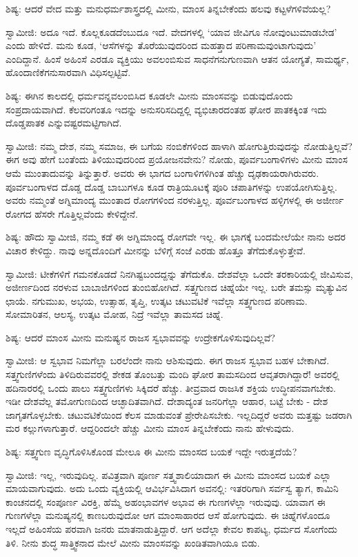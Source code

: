 ಶಿಷ್ಯ: ಆದರೆ ವೇದ ಮತ್ತು ಮನುಧರ್ಮಶಾಸ್ತ್ರದಲ್ಲಿ ಮೀನು, ಮಾಂಸ ತಿನ್ನಬೇಕೆಂದು ಹಲವು ಕಟ್ಟಳೆಗಳಿವೆಯಲ್ಲ?

ಸ್ವಾಮೀಜಿ: ಅದೂ ಇದೆ. ಕೊಲ್ಲಕೂಡದೆಂಬುದೂ ಇದೆ. ವೇದಗಳಲ್ಲಿ ‘ಯಾವ ಜೀವಿಗೂ ನೋವುಂಟುಮಾಡಬೇಡ’ ಎಂದು ಹೇಳಿದೆ. ಮನು ಕೂಡ, ‘ಆಸೆಗಳನ್ನು ತೊರೆಯುವುದರಿಂದ ಮಹತ್ತಾದ ಪರಿಣಾಮವುಂಟಾಗುವುದು’ ಎಂದಿದ್ದಾನೆ. ಹಿಂಸೆ ಅಹಿಂಸೆ ಎರಡೂ ವ್ಯಕ್ತಿಯು ಅವಲಂಬಿಸುವ ಸಾಧನೆಗನುಗುಣವಾಗಿ ಆತನ ಯೋಗ್ಯತೆ, ಸಾಮರ್ಥ್ಯ, ಹೊಂದಾಣಿಕೆಗನುಸಾರವಾಗಿ ವಿಧಿಸಲ್ಪಟ್ಟಿವೆ.

ಶಿಷ್ಯ: ಈಗಿನ ಕಾಲದಲ್ಲಿ ಧರ್ಮವನ್ನವಲಂಬಿಸಿದ ಕೂಡಲೇ ಮೀನು ಮಾಂಸವನ್ನು ಬಿಡುವುದೊಂದು ಸಂಪ್ರದಾಯವಾಗಿದೆ. ಕೆಲವರಿಗಂತೂ ಇದನ್ನು ಅನುಸರಿಸದಿದ್ದಲ್ಲಿ ವ್ಯಭಿಚಾರದಂತಹ ಘೋರ ಪಾತಕಕ್ಕಿಂತ ಇದು ದೊಡ್ಡಪಾತಕ ಎನ್ನುವಷ್ಟರಮಟ್ಟಿಗಾಗಿದೆ.

ಸ್ವಾಮೀಜಿ: ನಮ್ಮ ದೇಶ, ನಮ್ಮ ಸಮಾಜ, ಈ ಬಗೆಯ ನಂಬಿಕೆಗಳಿಂದ ಹಾಳಾಗಿ ಹೋಗುತ್ತಿರುವುದನ್ನು ನೋಡುತ್ತಿಲ್ಲವೆ? ಈಗ ಅವು ಹೇಗೆ ಬಂತೆಂದು ತಿಳಿಯುವುದರಿಂದ ಪ್ರಯೋಜನವೇನು? ನೋಡು, ಪೂರ್ವಬಂಗಾಳಿಗಳು ಮೀನು ಮಾಂಸ ಆಮೆ ಮುಂತಾದುವನ್ನು ತಿನ್ನುತ್ತಾರೆ. ಅವರು ಈ ಭಾಗದ ಬಂಗಾಳಿಗಳಿಗಿಂತ ಹೆಚ್ಚು ದೃಢಕಾಯರಾಗಿರುವರು. ಪೂರ್ವಬಂಗಾಳದ ದೊಡ್ಡ ದೊಡ್ಡ ಬಾಬುಗಳೂ ಕೂಡ ರಾತ್ರಿಯೂಟಕ್ಕೆ ಪೂರಿ ಚಪಾತಿಗಳನ್ನು ಉಪಯೋಗಿಸುತ್ತಿಲ್ಲ. ಅವರು ನಮ್ಮಂತೆ ಅಗ್ನಿಮಾಂದ್ಯ ಮುಂತಾದ ರೋಗಗಳಿಂದ ನರಳುತ್ತಿಲ್ಲ. ಪೂರ್ವಬಂಗಾಳದ ಹಳ್ಳಿಗಳಲ್ಲಿ ಈ ಅಜೀರ್ಣ ರೋಗದ ಹೆಸರೇ ಗೊತ್ತಿಲ್ಲವೆಂದು ಕೇಳಿದ್ದೇನೆ.

ಶಿಷ್ಯ: ಹೌದು ಸ್ವಾಮೀಜಿ, ನಮ್ಮ ಕಡೆ ಈ ಅಗ್ನಿಮಾಂದ್ಯ ರೋಗವೇ ಇಲ್ಲ. ಈ ಭಾಗಕ್ಕೆ ಬಂದಮೇಲೆಯೇ ನಾನು ಅದರ ವಿಚಾರ ಕೇಳಿದ್ದು. ನಾವು ಅನ್ನದೊಂದಿಗೆ ಮೀನನ್ನು ಬೆಳಿಗ್ಗೆ ಸಂಜೆ ಎರಡು ಹೊತ್ತೂ ತೆಗೆದುಕೊಳ್ಳುತ್ತೇವೆ.

ಸ್ವಾಮೀಜಿ: ಟೀಕೆಗಳಿಗೆ ಗಮನಕೊಡದೆ ನಿನಗಿಷ್ಟಬಂದದ್ದನ್ನು ತೆಗೆದುಕೊ. ದೇಶವೆಲ್ಲಾ ಒಂದೇ ತರಕಾರಿಯಲ್ಲಿ ಜೀವಿಸುವ, ಅಜೀರ್ಣದಿಂದ ನರಳುವ ಬಾಬಾಜಿಗಳಿಂದ ತುಂಬಿಹೋಗಿದೆ. ಸತ್ತ್ವಗುಣದ ಚಿಹ್ನೆಯೇ ಇಲ್ಲ. ಬರೇ ತಮಸ್ಸು ಮೃತ್ಯುವಿನ ಛಾಯೆ. ನಗುಮುಖ, ಅಭಯ, ಉತ್ಸಾಹ, ತೃಪ್ತಿ, ಉತ್ಕಟ ಚಟುವಟಿಕೆ ಇವೆಲ್ಲಾ ಸತ್ತ್ವಗುಣದ ಪರಿಣಾಮ. ಸೋಮಾರಿತನ, ಆಲಸ್ಯ, ಉತ್ಕಟ ಮೋಹ, ನಿದ್ರೆ ಇವೆಲ್ಲಾ ತಾಮಸದ ಚಿಹ್ನೆ.

ಶಿಷ್ಯ: ಆದರೆ ಮಾಂಸ ಮೀನು ಮನುಷ್ಯನ ರಾಜಸ ಸ್ವಭಾವವನ್ನು ಉದ್ರೇಕಗೊಳಿಸುವುದಿಲ್ಲವೆ?

ಸ್ವಾಮೀಜಿ: ಆ ಸ್ವಭಾವ ನಿಮಗೆಲ್ಲಾ ಬರಲೆಂದೇ ನಾನು ಆಶಿಸುವುದು. ಈಗ ರಾಜಸ ಸ್ವಭಾವ ಬಹಳ ಬೇಕಾಗಿದೆ. ಸತ್ತ್ವಗುಣಿಗಳೆಂದು ತಿಳಿದಿರುವವರಲ್ಲಿ ಶೇಕಡ ತೊಂಬತ್ತು ಮಂದಿ ಘೋರ ತಾಮಸದಿಂದ ಆವೃತರಾಗಿದ್ದಾರೆ! ಅವರಲ್ಲಿ ಹದಿನಾರರಲ್ಲಿ ಒಂದು ಪಾಲು ಸತ್ತ್ವಗುಣಿಗಳು ಸಿಕ್ಕಿದರೆ ಹೆಚ್ಚು. ತೀವ್ರವಾದ ರಾಜಸಿಕ ಶಕ್ತಿಯ ಉದ್ಧೀಪನವಾಗಬೇಕು. ಇಡೀ ದೇಶವೆಲ್ಲ ತಮೋಗುಣದಿಂದ ಆಚ್ಛಾದಿತವಾಗಿದೆ. ದೇಶಾದ್ಯಂತ ಜನರಿಗೆಲ್ಲಾ ಆಹಾರ, ಬಟ್ಟೆ ಬೇಕು - ದೇಶ ಜಾಗೃತಗೊಳ್ಳಬೇಕು. ಚಟುವಟಿಕೆಯಿಂದ ಕೆಲಸ ಮಾಡುವಂತೆ ಪ್ರೇರೇಪಿಸಬೇಕು. ಇಲ್ಲದಿದ್ದರೆ ಅವರು ಮತ್ತಷ್ಟು ಜಡರಾಗಿ ಮರ ಕಲ್ಲುಗಳಾಗುತ್ತಾರೆ. ಆದ್ದರಿಂದಲೇ ಹೆಚ್ಚು ಮೀನು ಮಾಂಸ ತಿನ್ನಬೇಕೆಂದು ನಾನು ಹೇಳುವುದು.

ಶಿಷ್ಯ: ಸತ್ತ್ವಗುಣ ವೃದ್ಧಿಗೊಳಿಸಿಕೊಂಡ ಮೇಲೂ ಈ ಮೀನು ಮಾಂಸದ ಬಯಕೆ ಇದ್ದೇ ಇರುತ್ತದೆಯೆ?

ಸ್ವಾಮೀಜಿ: ಇಲ್ಲ, ಇರುವುದಿಲ್ಲ. ಪವಿತ್ರವಾಗಿ ಪೂರ್ಣ ಸತ್ತ್ವಶಾಲಿಯಾದಾಗ ಈ ಮೀನು ಮಾಂಸದ ಬಯಕೆ ಎಲ್ಲಾ ಮಾಯವಾಗುವುದು. ಅದು ಒಂದು ವ್ಯಕ್ತಿಯಲ್ಲಿ ಆವಿರ್ಭವಿಸಿದಾಗ ಅವನಲ್ಲಿ: ಇತರರಿಗಾಗಿ ಸರ್ವಸ್ವ ತ್ಯಾಗ, ಕಾಮಿನಿ ಕಾಂಚನದಲ್ಲಿ ಸಂಪೂರ್ಣ ವಿರಕ್ತಿ, ಹೆಮ್ಮೆ ಅಹಂಭಾವಗಳ ಅಭಾವ ಈ ಗುಣಗಳೆಲ್ಲಾ ಇರುವುವು. ಯಾವಾಗ ಈ ಗುಣಗಳೆಲ್ಲಾ ಮನುಷ್ಯನಲ್ಲಿ ಕಾಣಬರುವುದೋ ಆಗ ಮಾಂಸಾಹಾರದ ಆಸೆ ಹೋಗುವುದು. ಈ ಚಿಹ್ನೆಗಳೊಂದೂ ಇಲ್ಲದೆ ಅಹಿಂಸೆಯ ಪರವಾಗಿ ಜನರು ಮಾತನಾಡುತ್ತಿದ್ದಾರೆ. ಆಗ ಅದೆಲ್ಲಾ ಕೇವಲ ಕಾಪಟ್ಯ, ಧರ್ಮದ ಸೋಗೆಂದು ತಿಳಿ. ನೀನು ಶುದ್ಧ ಸಾತ್ತ್ವಿಕನಾದ ಮೇಲೆ ಮೀನು ಮಾಂಸವನ್ನು ಖಂಡಿತವಾಗಿಯೂ ಬಿಡು.

